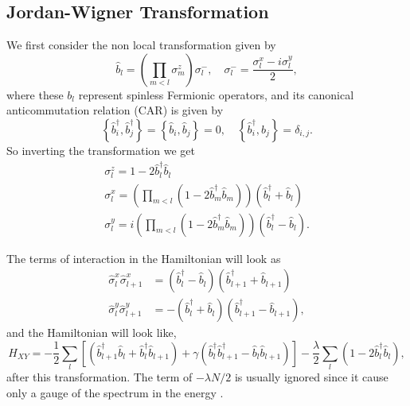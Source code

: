 \subsection{Jordan-Wigner Transformation}
We first consider the non local transformation given by
\begin{equation}
\hat{b}_{l}=\left(\prod_{m<l} \sigma_{m}^{z}\right) \sigma_{l}^{-}, \quad \sigma_{l}^{-}=\frac{\sigma_{l}^{x}-i \sigma_{l}^{y}}{2},
\end{equation}
where these $b_l$ represent spinless Fermionic operators, and its canonical anticommutation relation (CAR) is given by\cite{reyes-lega_aspects_2016} 
\begin{equation}
\left\{\hat{b}_{i}^{\dagger}, \hat{b}_{j}^{\dagger}\right\}=\left\{\hat{b}_{i}, \hat{b}_{j}\right\}=0, \quad\left\{\hat{b}_{i}^{\dagger}, \hat{b}_{j}\right\}=\delta_{i, j}.
\end{equation}
So inverting the transformation we get 
\begin{equation}
\begin{array}{l}
\sigma_{l}^{z}=1-2 \hat{b}_{l}^{\dagger} \hat{b}_{l} \\
\sigma_{l}^{x}=\left(\prod_{m<l}\left(1-2 \hat{b}_{m}^{\dagger} \hat{b}_{m}\right)\right)\left(\hat{b}_{l}^{\dagger}+\hat{b}_{l}\right) \\
\sigma_{l}^{y}=i\left(\prod_{m<l}\left(1-2 \hat{b}_{m}^{\dagger} \hat{b}_{m}\right)\right)\left(\hat{b}_{l}^{\dagger}-\hat{b}_{l}\right).
\end{array}
\end{equation}

The terms of interaction in the Hamiltonian will look as
\begin{equation}
\begin{aligned}
\hat{\sigma}_{l}^{x} \hat{\sigma}_{l+1}^{x} &=\left(\hat{b}_{l}^{\dagger}-\hat{b}_{l}\right)\left(\hat{b}_{l+1}^{\dagger}+\hat{b}_{l+1}\right) \\
\hat{\sigma}_{l}^{y} \hat{\sigma}_{l+1}^{y} &=-\left(\hat{b}_{l}^{\dagger}+\hat{b}_{l}\right)\left(\hat{b}_{l+1}^{\dagger}-\hat{b}_{l+1}\right),
\end{aligned}
\end{equation}
and the Hamiltonian will look like,
\begin{equation}
H_{X Y}=-\frac{1}{2} \sum_{l}\left[\left(\hat{b}_{l+1}^{\dagger} \hat{b}_{l}+\hat{b}_{l}^{\dagger} \hat{b}_{l+1}\right)+\gamma\left(\hat{b}_{l}^{\dagger} \hat{b}_{l+1}^{\dagger}-\hat{b}_{l} \hat{b}_{l+1}\right)\right]-\frac{\lambda}{2} \sum_{l}\left(1-2 \hat{b}_{l}^{\dagger} \hat{b}_{l}\right),
\end{equation}
after this transformation. The term of $-\lambda N/2$ is usually ignored since it cause only a gauge of the spectrum in the energy\cite{reyes-lega_aspects_2016} .
